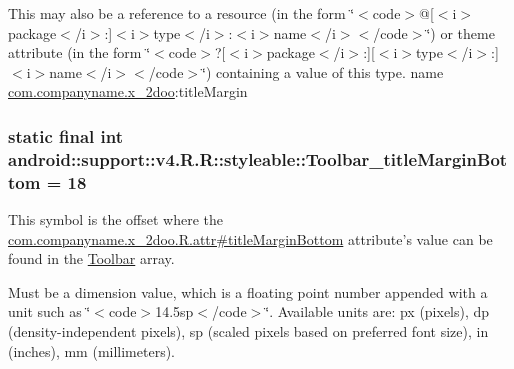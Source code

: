 This may also be a reference to a resource (in the form \char`\"{}$<$code$>$@\mbox{[}$<$i$>$package$<$/i$>$:\mbox{]}$<$i$>$type$<$/i$>$:$<$i$>$name$<$/i$>$$<$/code$>$\char`\"{}) or theme attribute (in the form \char`\"{}$<$code$>$?\mbox{[}$<$i$>$package$<$/i$>$:\mbox{]}\mbox{[}$<$i$>$type$<$/i$>$:\mbox{]}$<$i$>$name$<$/i$>$$<$/code$>$\char`\"{}) containing a value of this type.  name \hyperlink{namespacecom_1_1companyname_1_1x__2doo}{com.companyname.x\_\-2doo}:titleMargin \hypertarget{classandroid_1_1support_1_1v4_1_1_r_1_1styleable_433a3c5c0de8d666a83b66f953bf878b}{
\subsubsection[{Toolbar\_\-titleMarginBottom}]{\setlength{\rightskip}{0pt plus 5cm}static final int android::support::v4.R.R::styleable::Toolbar\_\-titleMarginBottom = 18}}
\label{classandroid_1_1support_1_1v4_1_1_r_1_1styleable_433a3c5c0de8d666a83b66f953bf878b}


This symbol is the offset where the \hyperlink{classcom_1_1companyname_1_1x__2doo_1_1_r_1_1attr_3ea062127ccb277197dfc6e078435b34}{com.companyname.x\_\-2doo.R.attr\#titleMarginBottom} attribute's value can be found in the \hyperlink{classandroid_1_1support_1_1v4_1_1_r_1_1styleable_0646d71cfbd4a8645c7d805b33e1c574}{Toolbar} array.

Must be a dimension value, which is a floating point number appended with a unit such as \char`\"{}$<$code$>$14.5sp$<$/code$>$\char`\"{}. Available units are: px (pixels), dp (density-independent pixels), sp (scaled pixels based on preferred font size), in (inches), mm (millimeters). 

